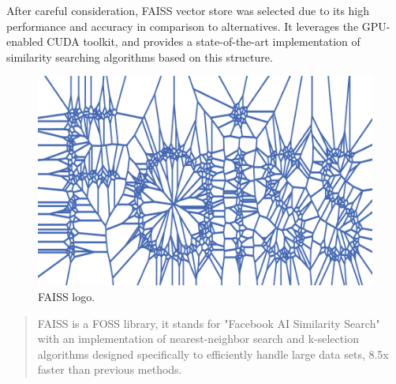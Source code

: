 After careful consideration, FAISS vector store was selected due to its high performance and accuracy in comparison to alternatives. It leverages the GPU-enabled CUDA toolkit, and provides a state-of-the-art implementation of similarity searching algorithms based on this structure.
\begin{figure}[htbp]
    \centering
    \includegraphics[width=\linewidth]{./figures/faiss_logo.png}
    \caption{FAISS logo.}
\end{figure}\newline
\begin{quote}
    FAISS is a FOSS library, it stands for "Facebook AI Similarity Search" with an implementation of nearest-neighbor search and k-selection algorithms designed specifically to efficiently handle large data sets, 8.5x faster than previous methods.
\end{quote}

